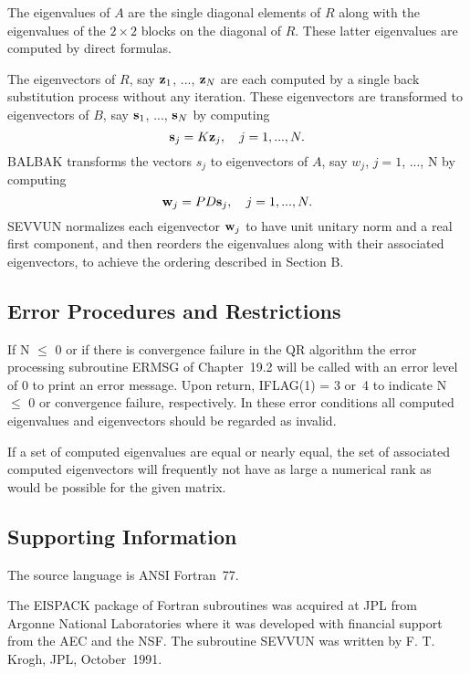 \documentclass[twoside]{MATH77}
\begin{document}
The eigenvalues of $A$ are the single diagonal elements of $R$ along with the
eigenvalues of the $2 \times 2$ blocks on the diagonal of $R$. These latter
eigenvalues are computed by direct formulas.

The eigenvectors of $R$, say ${\bf z}_1$, ..., ${\bf z}_N$ are each computed
by a single back substitution process without any iteration. These
eigenvectors are transformed to eigenvectors of $B$, say ${\bf s}_1$, ..., $%
{\bf s}_N$ by computing%
\begin{equation*}
{\bf s}_j=K{\bf z}_j,\quad j=1,...,N.
\end{equation*}
BALBAK transforms the vectors $s_j$ to eigenvectors of $A$, say $w_j$, $j=1$,
..., N by computing%
\begin{equation*}
{\bf w}_j=PD{\bf s}_j,\quad j=1,...,N.
\end{equation*}
SEVVUN normalizes each eigenvector ${\bf w}_j$ to have unit unitary norm
and a real first component, and then reorders the eigenvalues along with
their associated eigenvectors, to achieve the ordering described in Section B.




\subsection{Error Procedures and Restrictions}

If N $\leq $ 0 or if there is convergence failure in the QR algorithm the
error processing subroutine ERMSG of Chapter~19.2 will be called with
an error level of 0 to print an error message.  Upon return, IFLAG(1) = 3
or~4 to indicate N $\leq $ 0 or convergence failure, respectively.
In these error conditions all computed eigenvalues and eigenvectors should
be regarded as invalid.

If a set of computed eigenvalues are equal or nearly equal, the set of
associated computed eigenvectors will frequently not have as large a
numerical rank as would be possible for the given matrix.

\subsection{Supporting Information}

The source language is ANSI Fortran~77.

The EISPACK package of Fortran subroutines was acquired at JPL
from Argonne National Laboratories where it was developed with financial
support from the AEC and the NSF. The subroutine SEVVUN was written by F. T.
Krogh, JPL, October~1991.
\end{document}
